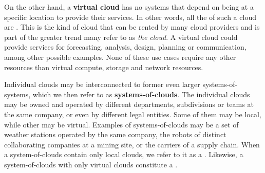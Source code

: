 On the other hand, a \textbf{virtual cloud} has no systems that depend on being at a specific location to provide their services.
In other words, all the  of such a cloud are .
This is the kind of cloud that can be rented by many cloud providers and is part of the greater trend many refer to as \textit{the cloud}.
A virtual cloud could provide services for forecasting, analysis, design, planning or communication, among other possible examples.
None of these use cases require any other resources than virtual compute, storage and network resources.

Individual clouds may be interconnected to former even larger systems-of-systems, which we then refer to as \textbf{systems-of-clouds}.
The individual clouds may be owned and operated by different departments, subdivisions or teams at the same company, or even by different legal entities.
Some of them may be local, while other may be virtual.
Examples of systems-of-clouds may be a set of weather stations operated by the same company, the robots of distinct collaborating companies at a mining site, or the carriers of a supply chain.
When a system-of-clouds contain only local clouds, we refer to it as a .
Likewise, a system-of-clouds with only virtual clouds constitute a .

